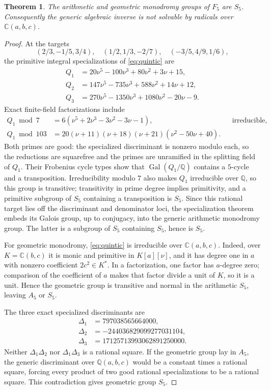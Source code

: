 \documentclass[11pt]{amsart}
\newtheorem{theorem}{Theorem}[section]
\theoremstyle{remark}
\newcommand{\C}{\mathbb C}
\newcommand{\Q}{\mathbb Q}
\begin{document}
\begin{theorem}\label{thm:S5}
The arithmetic and geometric monodromy groups of $F_5$ are $S_5$.
Consequently the generic algebraic inverse is not solvable by radicals over
$\C(a,b,c)$.
\end{theorem}
\begin{proof}
At the targets
\[
 (2/3,-1/5,3/4),\quad(1/2,1/3,-2/7),\quad(-3/5,4/9,1/6),
\]
the primitive integral specializations of \eqref{eq:quintic} are
\begin{align*}
 Q_1&=20\nu^5-100\nu^3+80\nu^2+3\nu+15,\\
 Q_2&=147\nu^5-735\nu^3+588\nu^2+14\nu+12,\\
 Q_3&=270\nu^5-1350\nu^3+1080\nu^2-20\nu-9.
\end{align*}
Exact finite-field factorizations include
\begin{align*}
 Q_1\bmod7&=6(\nu^5+2\nu^3-3\nu^2-3\nu-1), &&\text{irreducible},\\
 Q_1\bmod103&=20(\nu+11)(\nu+18)(\nu+21)(\nu^2-50\nu+40).
\end{align*}
Both primes are good: the specialized discriminant is nonzero modulo each, so the reductions are squarefree and the primes are unramified in the splitting field of $Q_1$.  Their Frobenius cycle types show that $\operatorname{Gal}(Q_1/\Q)$ contains a $5$-cycle and a transposition.  Irreducibility modulo $7$ also makes $Q_1$ irreducible over $\Q$, so this group is transitive; transitivity in prime degree implies primitivity, and a primitive subgroup of $S_5$ containing a transposition is $S_5$.  Since this rational target lies off the discriminant and denominator loci, the specialization theorem embeds its Galois group, up to conjugacy, into the generic arithmetic monodromy group.  The latter is a subgroup of $S_5$ containing $S_5$, hence is $S_5$.

For geometric monodromy, \eqref{eq:quintic} is irreducible over $\C(a,b,c)$.  Indeed, over $K=\C(b,c)$ it is monic and primitive in $K[a][\nu]$, and it has degree one in $a$ with nonzero coefficient $2c^2\in K^*$.  In a factorization, one factor has $a$-degree zero; comparison of the coefficient of $a$ makes that factor divide a unit of $K$, so it is a unit.  Hence the geometric group is transitive and normal in the arithmetic $S_5$, leaving $A_5$ or $S_5$.

The three exact specialized discriminants are
\begin{align*}
 \Delta_1&=797038565664000,\\
 \Delta_2&=-244036829099277031104,\\
 \Delta_3&=17125713993062891250000.
\end{align*}
Neither $\Delta_1\Delta_2$ nor $\Delta_1\Delta_3$ is a rational square.  If the geometric group lay in $A_5$, the generic discriminant over $\Q(a,b,c)$ would be a constant times a rational square, forcing every product of two good rational specializations to be a rational square.  This contradiction gives geometric group $S_5$.


\end{proof}
\end{document}
